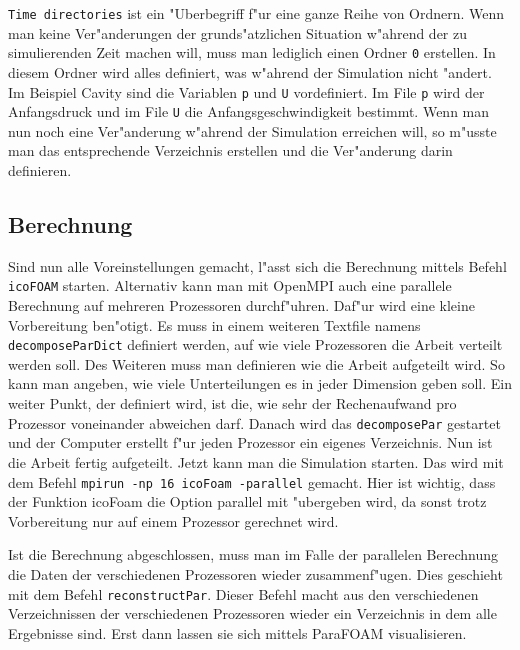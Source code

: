 \begin{refsection}
\texttt{Time directories} ist ein "Uberbegriff f"ur eine ganze Reihe von
Ordnern. Wenn man keine Ver"anderungen der grunds"atzlichen Situation
w"ahrend der zu simulierenden Zeit machen will, muss man lediglich einen
Ordner  \texttt{0} erstellen. In diesem Ordner wird alles definiert,
was w"ahrend der Simulation nicht "andert. Im Beispiel Cavity sind die
Variablen  \texttt{p} und  \texttt{U} vordefiniert.
Im File \texttt{p} wird der
Anfangsdruck und im File \texttt{U} die Anfangsgeschwindigkeit bestimmt.
Wenn man
nun noch eine Ver"anderung w"ahrend der Simulation erreichen will, so
m"usste man das entsprechende Verzeichnis erstellen und die Ver"anderung
darin definieren.

\subsection{Berechnung}
Sind nun alle Voreinstellungen gemacht, l"asst sich die Berechnung
mittels Befehl \texttt{icoFOAM} starten. Alternativ kann man mit OpenMPI auch
eine parallele Berechnung auf mehreren Prozessoren durchf"uhren. Daf"ur
wird eine kleine Vorbereitung ben"otigt. Es muss in einem weiteren
Textfile namens \texttt{decomposeParDict} definiert werden, auf wie
viele Prozessoren die Arbeit verteilt werden soll. Des Weiteren muss
man definieren wie die Arbeit aufgeteilt wird. So kann man angeben, wie
viele Unterteilungen es in jeder Dimension geben soll. Ein weiter Punkt,
der definiert wird, ist die, wie sehr der Rechenaufwand pro Prozessor
voneinander abweichen darf. Danach wird das \texttt{decomposePar}
gestartet und der Computer erstellt f"ur jeden Prozessor ein eigenes
Verzeichnis. Nun ist die Arbeit fertig aufgeteilt. Jetzt kann man
die Simulation starten. Das wird mit dem Befehl \texttt{mpirun -np 16
icoFoam -parallel} gemacht. Hier ist wichtig, dass der Funktion icoFoam
die Option parallel mit "ubergeben wird, da sonst trotz Vorbereitung
nur auf einem Prozessor gerechnet wird.

Ist die Berechnung abgeschlossen, muss man im Falle
der parallelen Berechnung die Daten der verschiedenen
Prozessoren wieder zusammenf"ugen. Dies geschieht mit dem Befehl
\texttt{reconstructPar}. Dieser Befehl macht aus den verschiedenen
Verzeichnissen der verschiedenen Prozessoren wieder ein Verzeichnis in
dem alle Ergebnisse sind. Erst dann lassen sie sich mittels ParaFOAM
visualisieren.


\end{refsection}
